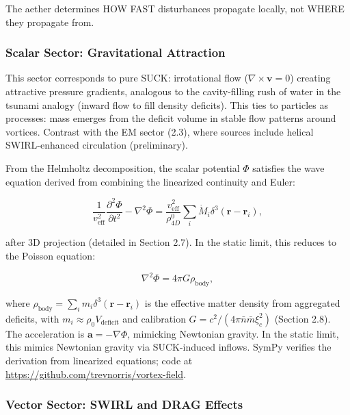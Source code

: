 \begin{tcolorbox}
The aether determines HOW FAST disturbances propagate locally, not WHERE they propagate from.
\end{tcolorbox}

\subsubsection{Scalar Sector: Gravitational Attraction}

This sector corresponds to pure SUCK: irrotational flow ($\nabla \times \mathbf{v} = 0$) creating attractive pressure gradients, analogous to the cavity-filling rush of water in the tsunami analogy (inward flow to fill density deficits). This ties to particles as processes: mass emerges from the deficit volume in stable flow patterns around vortices. Contrast with the EM sector (2.3), where sources include helical SWIRL-enhanced circulation (preliminary).

From the Helmholtz decomposition, the scalar potential $\Phi$ satisfies the wave equation derived from combining the linearized continuity and Euler:

\begin{equation}
\frac{1}{v_{\text{eff}}^2} \frac{\partial^2 \Phi}{\partial t^2} - \nabla^2 \Phi = \frac{v_{\text{eff}}^2}{\rho_{4D}^0} \sum_i \dot{M}_i \delta^3(\mathbf{r} - \mathbf{r}_i),
\end{equation}

after 3D projection (detailed in Section 2.7). In the static limit, this reduces to the Poisson equation:

\begin{equation}
\nabla^2 \Phi = 4\pi G \rho_{\text{body}},
\end{equation}

where $\rho_{\text{body}} = \sum_i m_i \delta^3(\mathbf{r} - \mathbf{r}_i)$ is the effective matter density from aggregated deficits, with $m_i \approx \rho_0 V_{\text{deficit}}$ and calibration $G = c^2 / (4\pi \bar{n} \bar{m} \xi_c^2)$ (Section 2.8). The acceleration is $\mathbf{a} = -\nabla \Phi$, mimicking Newtonian gravity. In the static limit, this mimics Newtonian gravity via SUCK-induced inflows. SymPy verifies the derivation from linearized equations; code at \url{https://github.com/trevnorris/vortex-field}.

\subsubsection{Vector Sector: SWIRL and DRAG Effects}

